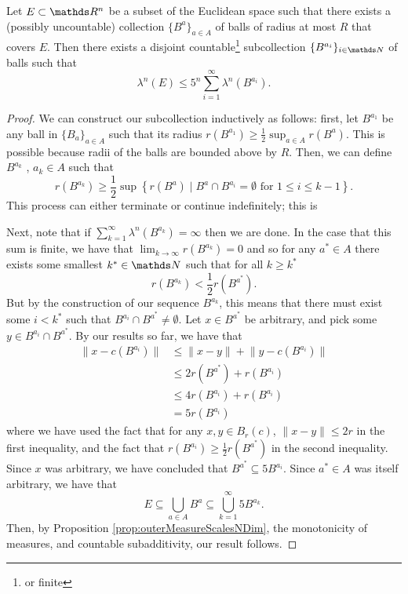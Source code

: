 \begin{lem}
    \label{lem:coveringLemma} Let $E\subset \R^n$ be a subset of the Euclidean space such that there exists a  (possibly uncountable) collection $\{B^a\}_{a\in A}$ of balls 
    of radius at most $R$ that covers $E$. Then there exists a disjoint countable\footnote{or finite} subcollection $\{B^{a_{i}}\}_{i\in \N}$ of balls such that 
    \[
        \lambda^n(E) \leq 5^n \sum_{i=1}^\infty \lambda^n(B^{a_i}).
    \]
\end{lem}
\begin{proof}
    We can construct our subcollection inductively as follows: first, let $B^{a_1}$ be any ball in $\{B_a\}_{a\in A}$ such that its radius $r(B^{a_1}) \geq \frac{1}{2}\sup_{a\in A} r(B^a)$. This is possible because radii of the balls are bounded above
    by $R$. Then, we can define $B^{a_k}$ , $a_k \in A$ such that
    \[
        r(B^{a_k}) \geq \frac{1}{2}\sup \left\{ r(B^a) \mid B^a \cap B^{a_i} = \emptyset \text{ for } 1 \leq i \leq k-1 \right\}.
    \]
    This process can either terminate or continue indefinitely; this is 

    Next, note that if $\sum_{k=1}^\infty \lambda^n \left( B^{a_k} \right) = \infty $ then we are done. In the case that this sum is finite, we have that 
    $\lim_{k\to\infty} r\left( B^{a_k} \right) = 0$ and so for any $a^* \in A$ there exists some smallest $k^* \in \N$ such that for all $k \geq k^*$
    \[
        r\left(B^{a_k}\right) < \frac{1}{2}r\left( B^{a^*} \right).
    \]
    But by the construction of our sequence $B^{a_k}$, this means that there must exist some $i < k^*$ such that $B^{a_i} \cap B^{a^*} \neq \emptyset$. Let $x \in B^{a^*}$ be arbitrary, and pick some 
    $y \in B^{a_i} \cap B^{a^*}$. By our results so far, we have that 
    \begin{align*}
        \lVert x - c\left(B^{a_i}\right) \rVert &\leq \lVert x - y \rVert + \lVert y - c\left(B^{a_i}\right) \rVert \\
            &\leq 2 r\left(B^{a^*}\right) + r\left(B^{a_i}\right) \\
            & \leq 4 r\left(B^{a_i}\right) + r\left(B^{a_i}\right) \\
            &= 5r\left(B^{a_i}\right)
    \end{align*}
    where we have used the fact that for any $x,y \in B_r(c)$, $\lVert x - y \rVert \leq 2r $ in the first inequality, and the fact that $r(B^{a_i}) \geq \frac{1}{2}r\left( B^{a^*} \right)$ in the second
    inequality. Since $x$ was arbitrary, we have concluded that $B^{a^*} \subseteq 5B^{a_i}$. Since $a^* \in A$ was itself arbitrary, 
    we have that 
    \[
        E \subseteq \bigcup_{a \in A} B^a \subseteq \bigcup_{k=1}^\infty 5 B^{a_k}.
    \]
    Then, by Proposition \ref{prop:outerMeasureScalesNDim}, the monotonicity of measures, and countable subadditivity, our result follows.
\end{proof}

